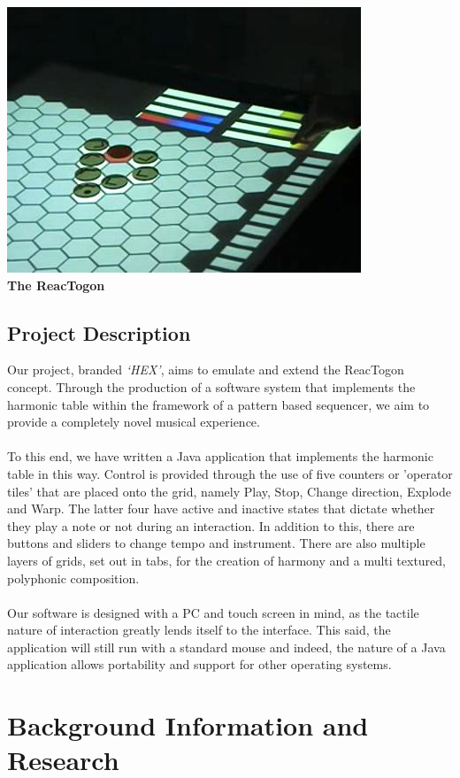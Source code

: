 \documentclass[10pt,a4paper]{article}
\begin{document}
\begin{center}
\includegraphics[scale=0.4]{1.jpg}\\
\textbf{The ReacTogon}
\end{center}

\subsection{Project Description}
Our project, branded \textit{`HEX’}, aims to emulate and extend the ReacTogon concept. Through the production of a software system that implements the harmonic table within the framework of a pattern based sequencer, we aim to provide a completely novel musical experience.\\
\\
To this end, we have written a Java application that implements the harmonic table in this way. Control is provided through the use of five counters or 'operator tiles' that are placed onto the grid, namely Play, Stop, Change direction, Explode and Warp. The latter four have active and inactive states that dictate whether they play a note or not during an interaction. In addition to this, there are buttons and sliders to change tempo and instrument. There are also multiple layers of grids, set out in tabs, for the creation of harmony and a multi textured, polyphonic composition.\\
\\
Our software is designed with a PC and touch screen in mind, as the tactile nature of interaction greatly lends itself to the interface. This said, the application will still run with a standard mouse and indeed, the nature of a Java application allows portability and support for other operating systems.

\pagebreak
\section{Background Information and Research}
\end{document}
